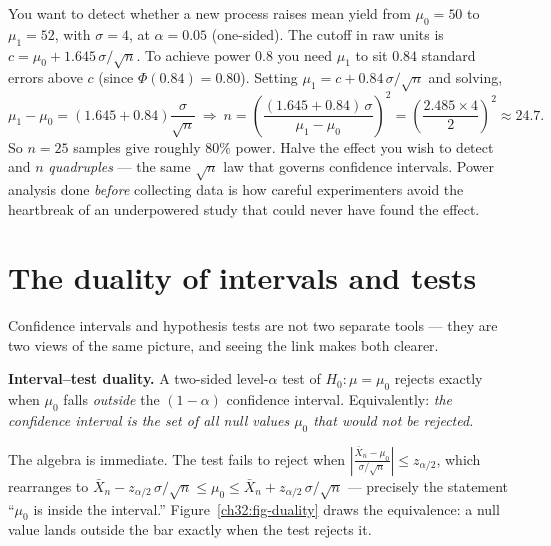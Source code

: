 \begin{example}
\label{ch32:ex-power}
You want to detect whether a new process raises mean yield from $\mu_0=50$ to
$\mu_1=52$, with $\sigma=4$, at $\alpha=0.05$ (one-sided). The cutoff in raw units is
$c = \mu_0 + 1.645\,\sigma/\sqrt n$. To achieve power $0.8$ you need $\mu_1$ to sit
$0.84$ standard errors above $c$ (since $\Phi(0.84)=0.80$). Setting
$\mu_1 = c + 0.84\,\sigma/\sqrt n$ and solving,
\[
  \mu_1 - \mu_0 = (1.645 + 0.84)\frac{\sigma}{\sqrt n}
  \ \Rightarrow\
  n = \left(\frac{(1.645+0.84)\,\sigma}{\mu_1-\mu_0}\right)^2
  = \left(\frac{2.485 \times 4}{2}\right)^2 \approx 24.7.
\]
So $n=25$ samples give roughly $80\%$ power. Halve the effect you wish to detect and $n$
\emph{quadruples} --- the same $\sqrt n$ law that governs confidence intervals. Power
analysis done \emph{before} collecting data is how careful experimenters avoid the
heartbreak of an underpowered study that could never have found the effect.
\end{example}

\section{The duality of intervals and tests}
\label{ch32:duality}

Confidence intervals and hypothesis tests are not two separate tools --- they are two
views of the same picture, and seeing the link makes both clearer.

\begin{focusbox}
\textbf{Interval--test duality.} A two-sided level-$\alpha$ test of $H_0\!:\mu=\mu_0$
rejects exactly when $\mu_0$ falls \emph{outside} the $(1-\alpha)$ confidence interval.
Equivalently: \emph{the confidence interval is the set of all null values $\mu_0$ that
would not be rejected.}
\end{focusbox}

The algebra is immediate. The test fails to reject when
$\left|\frac{\bar X_n - \mu_0}{\sigma/\sqrt n}\right| \le z_{\alpha/2}$, which rearranges
to $\bar X_n - z_{\alpha/2}\,\sigma/\sqrt n \le \mu_0 \le \bar X_n + z_{\alpha/2}\,
\sigma/\sqrt n$ --- precisely the statement ``$\mu_0$ is inside the interval.''
Figure~\ref{ch32:fig-duality} draws the equivalence: a null value lands outside the bar
exactly when the test rejects it.

